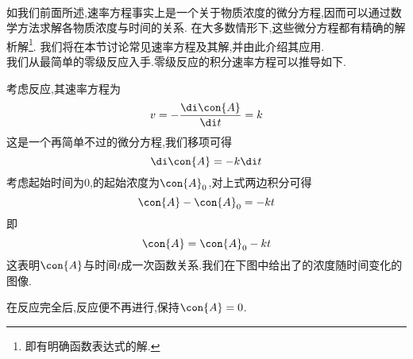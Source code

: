 \documentclass{ctexart}
\begin{document}
\pagestyle{plain}
\noindent{}\vspace{15pt}\\
\indent 如我们前面所述,速率方程事实上是一个关于物质浓度的微分方程,因而可以通过数学方法求解各物质浓度与时间的关系.%
在大多数情形下,这些微分方程都有精确的解析解\footnote{即有明确函数表达式的解.}.%
我们将在本节讨论常见速率方程及其解,并由此介绍其应用.\vspace{12pt}\\
\indent 我们从最简单的零级反应入手.零级反应的积分速率方程可以推导如下.
\begin{derivation}
    考虑反应,其速率方程为
    \[v=-\dfrac{\di\con{A}}{\di t}=k\]
    这是一个再简单不过的微分方程,我们移项可得
    \[\di\con{A}=-k\di t\]
    考虑起始时间为$0$,的起始浓度为$\con{A}_0$,对上式两边积分可得
    \[\con{A}-\con{A}_0=-kt\]
    即
    \[\con{A}=\con{A}_0-kt\]
    这表明$\con{A}$与时间$t$成一次函数关系.我们在下图中给出了的浓度随时间变化的图像.
    \begin{tightcenter}
        
    \end{tightcenter}
    在反应完全后,反应便不再进行,保持$\con{A}=0$.
\end{derivation}
\end{document}
